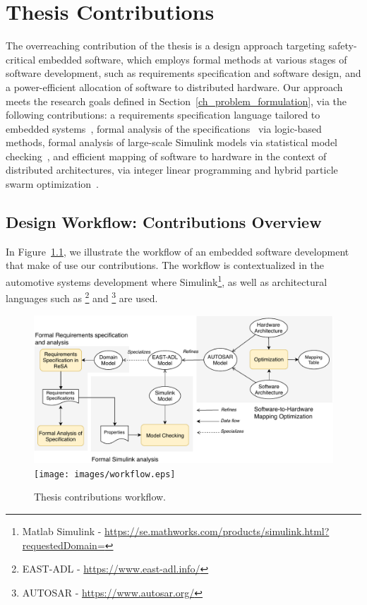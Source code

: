 \chapter{Thesis Contributions}
The overreaching contribution of the thesis is a design approach targeting safety-critical embedded software, which employs formal methods at various stages of software development, such as requirements specification and software design, and a power-efficient allocation of software to distributed hardware. Our approach meets the research goals defined in Section~\ref{ch_problem_formulation}, via the following contributions: a requirements specification language tailored to embedded systems~\cite{Mahmud2015ReSA:Systems}, formal analysis of the specifications~\cite{resatool}\cite{Mahmud2017SpecificationLogic} via logic-based methods, formal analysis of large-scale Simulink models via statistical model checking~\cite{Filipovikj2018SimppaalModels}, and efficient mapping of software to hardware in the context of distributed architectures, via integer linear programming and hybrid particle swarm optimization~\cite{Mahmud5222}\cite{Mahmud2019OptimizedConstraints}. 

\section{Design Workflow: Contributions Overview}
In Figure~\ref{fig_workflow}, we illustrate the workflow of an embedded software development that make of use our contributions. The workflow is contextualized in the automotive systems development where Simulink\footnote{Matlab Simulink - \url{https://se.mathworks.com/products/simulink.html?requestedDomain=}}, as well as architectural languages such as \eastadl\footnote{EAST-ADL - \url{https://www.east-adl.info/}} and \autosar\footnote{AUTOSAR - \url{https://www.autosar.org/}} are used.
\begin{figure}
	\centering
	\ifpdf
	\includegraphics[width=\linewidth]{images/workflow}
	\else
	\texttt{[image: images/workflow.eps]}
	\fi
	\caption{Thesis contributions workflow.} 
	\label{fig_workflow}
\end{figure}

